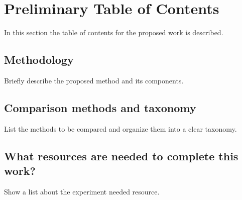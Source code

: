 \section{Preliminary Table of Contents}
\noindent
In this section the table of contents for the proposed work is described.



\subsection{Methodology}
\noindent
Briefly describe the proposed method and its components.



\subsection{Comparison methods and taxonomy}
\noindent
List the methods to be compared and organize them into a clear taxonomy.






\subsection{What resources are needed to complete this work?}
\noindent
Show a list about the experiment needed resource.






